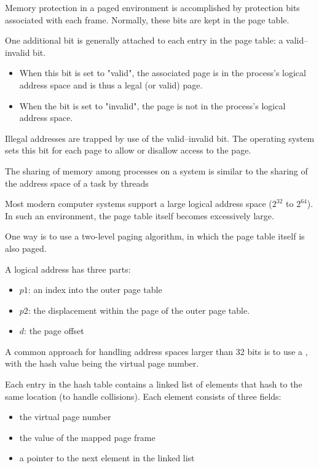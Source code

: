     \par Memory protection in a paged environment is accomplished by protection bits associated with each frame. Normally, these bits are kept in the page table.

    \par One additional bit is generally attached to each entry in the page table: a valid–invalid bit.
    \begin{itemize}
      \item When this bit is set to "valid", the associated page is in the process's logical address space and is thus a legal (or valid) page.
      \item When the bit is set to "invalid", the page is not in the process's logical address space.
    \end{itemize}
    \par Illegal addresses are trapped by use of the valid–invalid bit. The operating system sets this bit for each page to allow or disallow access to the page.

    \par The sharing of memory among processes on a system is similar to the sharing of the address space of a task by threads


    \par Most modern computer systems support a large logical address space ($2^32$ to $2^64$). In such an environment, the page table itself becomes excessively large.
    \par One way is to use a two-level paging algorithm, in which the page table itself is also paged.
    \par A logical address has three parts:
    \begin{itemize}
      \item $p1$: an index into the outer page table
      \item $p2$:  the displacement within the page of the outer page table.
      \item $d$: the page offset
    \end{itemize}

    \par A common approach for handling address spaces larger than 32 bits is to use a , with the hash value being the virtual page number.
    \par  Each entry in the hash table contains a linked list of elements that hash to the same
location (to handle collisions). Each element consists of three fields: 
      \begin{itemize}
        \item the virtual page number
        \item the value of the mapped page frame
        \item a pointer to the next element in the linked list
      \end{itemize}


